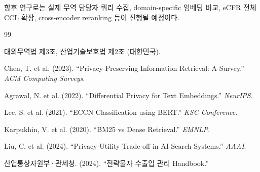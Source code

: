 \documentclass[11pt,a4paper]{article}
\begin{document}
향후 연구로는 실제 무역 담당자 쿼리 수집, domain-specific 임베딩 비교, eCFR 전체 CCL 확장, cross-encoder reranking 등이 진행될 예정이다.

\begin{thebibliography}{99}

 대외무역법 제3조, 산업기술보호법 제2조 (대한민국).

 Chen, T. et al. (2023). ``Privacy-Preserving Information Retrieval: A Survey.'' \textit{ACM Computing Surveys}.

 Agrawal, N. et al. (2022). ``Differential Privacy for Text Embeddings.'' \textit{NeurIPS}.

 Lee, S. et al. (2021). ``ECCN Classification using BERT.'' \textit{KSC Conference}.

 Karpukhin, V. et al. (2020). ``BM25 vs Dense Retrieval.'' \textit{EMNLP}.

 Liu, C. et al. (2024). ``Privacy-Utility Trade-off in AI Search Systems.'' \textit{AAAI}.

 산업통상자원부·관세청. (2024). ``전략물자 수출입 관리 Handbook.''

\end{thebibliography}
\end{document}

